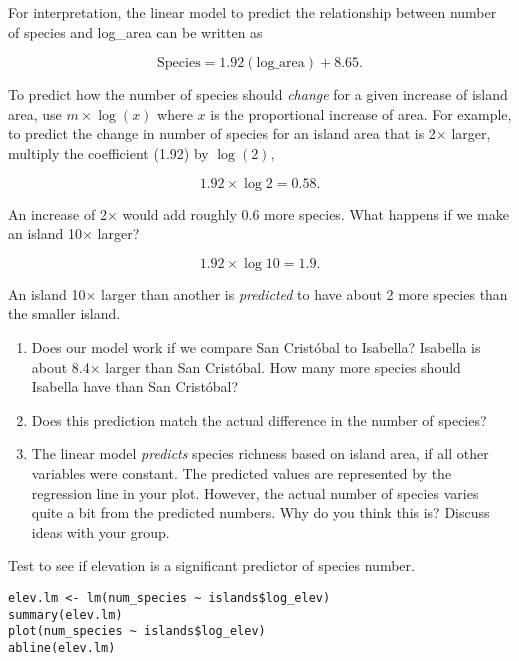 \documentclass[11pt]{article}
\newcommand{\bigSpace}{\vspace{4\baselineskip}}
\begin{document}
For interpretation, the linear model to predict the relationship between number of species and log\_area can be written as

\[ \mathrm{Species} = 1.92\left(\mathrm{log\_area}\right) + 8.65.\]

To predict how the number of species should \emph{change} for a given  increase of island area, use $m \times \log(x)$ where $x$ is the proportional increase of area. For example, to predict the change in number of species for an island area that is 2$\times$ larger, multiply the coefficient (1.92) by $\log{(2)},$


 \[ 1.92 \times \log 2 = 0.58.\]
 
An increase of 2$\times$ would add roughly 0.6 more species. What happens if we make an island 10$\times$ larger? 
 
 \[ 1.92 \times \log10 = 1.9.\]
 
An island 10$\times$ larger than another is \emph{predicted} to have about 2 more species than the smaller island.
 
\begin{enumerate}[resume]
\item Does our model work if we compare San Cristóbal to Isabella? Isabella is about 8.4$\times$ larger than San Cristóbal. How many more species should Isabella have than San Cristóbal?

\bigSpace
 
\item Does this prediction match the actual difference in the number of species? 
 
\bigSpace

 
\item The linear model \emph{predicts} species richness based on island area, if all other variables were constant. The predicted values are represented by the regression line in your plot.  However, the actual number of species varies quite a bit from the predicted numbers. Why do you think this is? Discuss ideas with your group.


\bigSpace

\end{enumerate}
 

Test to see if elevation is a significant predictor of species number.

\begin{verbatim}
elev.lm <- lm(num_species ~ islands$log_elev)
summary(elev.lm)
plot(num_species ~ islands$log_elev)
abline(elev.lm)
\end{verbatim}
\end{document}
